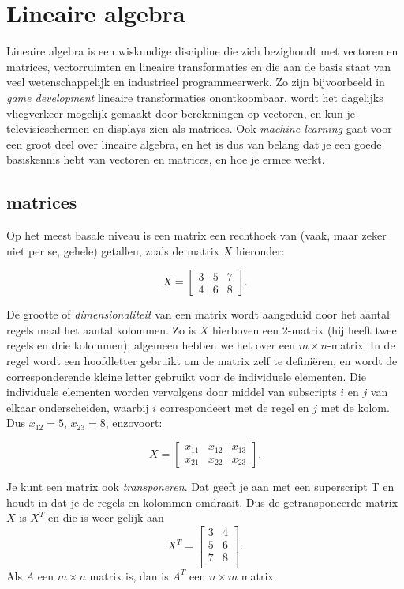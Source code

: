 
\section{Lineaire algebra}
Lineaire algebra is een wiskundige discipline die zich bezighoudt met vectoren en matrices, vectorruimten en lineaire transformaties en die aan de basis staat van veel wetenschappelijk en industrieel programmeerwerk. Zo zijn bijvoorbeeld in \textit{game development} lineaire transformaties onontkoombaar, wordt het dagelijks vliegverkeer mogelijk gemaakt door berekeningen op vectoren, en kun je televisieschermen en displays zien als matrices. Ook \textit{machine learning} gaat voor een groot deel over lineaire algebra, en het is dus van belang dat je een goede basiskennis hebt van vectoren en matrices, en hoe je ermee werkt.

\subsection{matrices}
Op het meest basale niveau is een matrix een rechthoek van (vaak, maar zeker niet per se, gehele) getallen, zoals de matrix $X$ hieronder:

\[ 
X = \begin{bmatrix} 
3 & 5 & 7 \\
4 & 6 & 8
\end{bmatrix}.
\] 

De grootte of \textit{dimensionaliteit} van een matrix wordt aangeduid door het aantal regels maal het aantal kolommen. Zo is $X$ hierboven een 2-matrix (hij heeft twee regels en drie kolommen); algemeen hebben we het over een $m \times n$-matrix. In de regel wordt een hoofdletter gebruikt om de matrix zelf te definiëren, en wordt de corresponderende kleine letter gebruikt voor de individuele elementen. Die individuele elementen worden vervolgens door middel van subscripts $i$ en $j$ van elkaar onderscheiden, waarbij $i$ correspondeert met de regel en $j$ met de kolom. Dus $x_{12} = 5$, $x_{23} = 8$, enzovoort:

\[ 
X = \begin{bmatrix} 
x_{11} & x_{12} & x_{13} \\
x_{21} & x_{22} & x_{23}
\end{bmatrix}.
\] 

Je kunt een matrix ook \textit{transponeren}. Dat geeft je aan met een superscript T en houdt in dat je de regels en kolommen omdraait. Dus de getransponeerde matrix $X$ is $X^T$ en die is weer gelijk aan
%
\[ 
X^T = \begin{bmatrix} 
3 & 4 \\
5 & 6 \\
7 & 8 \\
\end{bmatrix}.
\] 
%
Als $A$ een $m \times n$ matrix is, dan is $A^T$ een $n \times m$ matrix.


